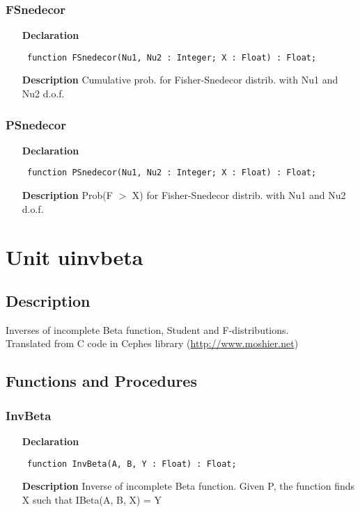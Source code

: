 \documentclass[12pt,a4paper,oneside]{report}
\newcommand{\declarationitem}[1]{\textbf{#1}}
\newcommand{\descriptiontitle}[1]{\textbf{#1}}
\newcommand{\code}[1]{\texttt{#1}}
\begin{document}
\subsubsection{FSnedecor}
\label{uibtdist-FSnedecor}
\begin{itemize}\item[\declarationitem{Declaration}\hfill]
	\begin{flushleft}
		\code{
			function FSnedecor(Nu1, Nu2 : Integer; X : Float) : Float;}
	\end{flushleft}
	\item[\descriptiontitle{Description}]
	Cumulative prob. for Fisher{-}Snedecor distrib. with Nu1 and Nu2 d.o.f.
\end{itemize}
\subsubsection{PSnedecor}
\label{uibtdist-PSnedecor}
\begin{itemize}\item[\declarationitem{Declaration}\hfill]
	\begin{flushleft}
		\code{
			function PSnedecor(Nu1, Nu2 : Integer; X : Float) : Float;}
	\end{flushleft}
	\item[\descriptiontitle{Description}]
	Prob(F {$>$} X) for Fisher{-}Snedecor distrib. with Nu1 and Nu2 d.o.f.
\end{itemize}

\section{Unit uinvbeta}
\label{uinvbeta}
\subsection{Description}
Inverses of incomplete Beta function, Student and F{-}distributions.\\
Translated from C code in Cephes library (\href{http://www.moshier.net}{http://www.moshier.net}) 
\subsection{Functions and Procedures}
\subsubsection{InvBeta}
\label{uinvbeta-InvBeta}
\begin{itemize}\item[\declarationitem{Declaration}\hfill]
	\begin{flushleft}
		\code{
			function InvBeta(A, B, Y : Float) : Float;}
	\end{flushleft}
	\par
	\item[\descriptiontitle{Description}]
	Inverse of incomplete Beta function. Given P, the function finds X such that IBeta(A, B, X) = Y
\end{itemize}
\end{document}
